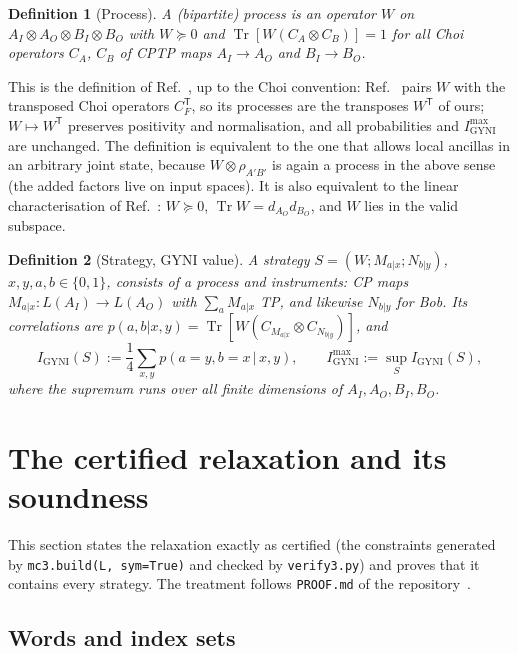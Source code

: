 \documentclass[aps,pra,onecolumn,notitlepage,superscriptaddress,longbibliography,nofootinbib,11pt]{revtex4-2}
\newtheorem{definition}{Definition}
\theoremstyle{remark}
\newcommand{\Tr}{\operatorname{Tr}}
\newcommand{\tp}{\mathsf{T}}
\newcommand{\Igy}{I_{\mathrm{GYNI}}}
\newcommand{\Imax}{I_{\mathrm{GYNI}}^{\max}}
\newcommand{\file}[1]{\texttt{#1}}
\begin{document}
\begin{definition}[Process]\label{def:process}
A (bipartite) process is an operator $W$ on $A_I\otimes A_O\otimes B_I\otimes B_O$ with $W\succeq0$ and $\Tr[W(C_A\otimes C_B)]=1$ for all Choi operators $C_A$, $C_B$ of CPTP maps $A_I\to A_O$ and $B_I\to B_O$.
\end{definition}

This is the definition of Ref.~\cite{Oreshkov2012}, up to the Choi convention: Ref.~\cite{Oreshkov2012} pairs $W$ with the transposed Choi operators $C_F^\tp$, so its processes are the transposes $W^\tp$ of ours; $W\mapsto W^\tp$ preserves positivity and normalisation, and all probabilities and $\Imax$ are unchanged. The definition is equivalent to the one that allows local ancillas in an arbitrary joint state, because $W\otimes\rho_{A'B'}$ is again a process in the above sense (the added factors live on input spaces). It is also equivalent to the linear characterisation of Ref.~\cite{Araujo2015}: $W\succeq0$, $\Tr W=d_{A_O}d_{B_O}$, and $W$ lies in the valid subspace.

\begin{definition}[Strategy, GYNI value]\label{def:strategy}
A strategy $S=(W;M_{a|x};N_{b|y})$, $x,y,a,b\in\{0,1\}$, consists of a process and instruments: CP maps $M_{a|x}:L(A_I)\to L(A_O)$ with $\sum_aM_{a|x}$ TP, and likewise $N_{b|y}$ for Bob. Its correlations are $p(a,b|x,y)=\Tr[W(C_{M_{a|x}}\otimes C_{N_{b|y}})]$, and
\begin{equation}
\Igy(S):=\frac14\sum_{x,y}p(a=y,b=x\,|\,x,y),\qquad \Imax:=\sup_S\Igy(S),
\end{equation}
where the supremum runs over all finite dimensions of $A_I,A_O,B_I,B_O$.
\end{definition}

\section{The certified relaxation and its soundness}\label{sec:relaxation}

This section states the relaxation exactly as certified (the constraints generated by \file{mc3.build(L, sym=True)} and checked by \file{verify3.py}) and proves that it contains every strategy. The treatment follows \file{PROOF.md} of the repository~\cite{repo}.

\subsection{Words and index sets}
\end{document}
